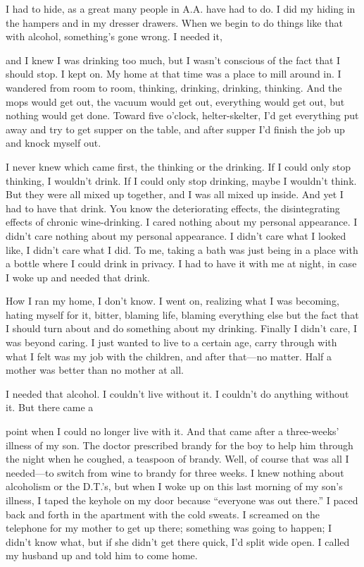 \begin{biblechapter}
I had to hide, as a great many people in A.A. have had to do. I did my hiding in the hampers and in my dresser drawers. When we begin to do things like that with alcohol, something’s gone wrong. I needed it,

and I knew I was drinking too much, but I wasn’t conscious of the fact that I should stop. I kept on. My home at that time was a place to mill around in. I wandered from room to room, thinking, drinking, drinking, thinking. And the mops would get out, the vacuum would get out, everything would get out, but nothing would get done. Toward five o’clock, helter-skelter, I’d get everything put away and try to get supper on the table, and after supper I’d finish the job up and knock myself out.

I never knew which came first, the thinking or the drinking. If I could only stop thinking, I wouldn’t drink. If I could only stop drinking, maybe I wouldn’t think. But they were all mixed up together, and I was all mixed up inside. And yet I had to have that drink. You know the deteriorating effects, the disintegrating effects of chronic wine-drinking. I cared nothing about my personal appearance. I didn’t care nothing about my personal appearance. I didn’t care what I looked like, I didn’t care what I did. To me, taking a bath was just being in a place with a bottle where I could drink in privacy. I had to have it with me at night, in case I woke up and needed that drink.

How I ran my home, I don’t know. I went on, realizing what I was becoming, hating myself for it, bitter, blaming life, blaming everything else but the fact that I should turn about and do something about my drinking. Finally I didn’t care, I was beyond caring. I just wanted to live to a certain age, carry through with what I felt was my job with the children, and after that—no matter. Half a mother was better than no mother at all.

I needed that alcohol. I couldn’t live without it. I couldn’t do anything without it. But there came a

point when I could no longer live with it. And that came after a three-weeks’ illness of my son. The doctor prescribed brandy for the boy to help him through the night when he coughed, a teaspoon of brandy. Well, of course that was all I needed—to switch from wine to brandy for three weeks. I knew nothing about alcoholism or the D.T.’s, but when I woke up on this last morning of my son’s illness, I taped the keyhole on my door because “everyone was out there.” I paced back and forth in the apartment with the cold sweats. I screamed on the telephone for my mother to get up there; something was going to happen; I didn’t know what, but if she didn’t get there quick, I’d split wide open. I called my husband up and told him to come home.


\end{biblechapter}
